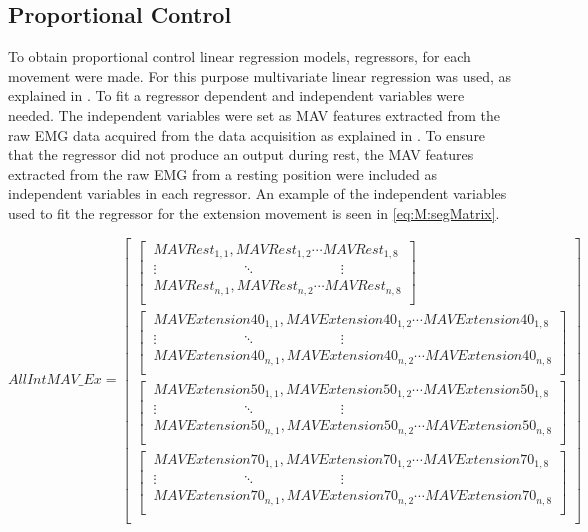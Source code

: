 \subsection{Proportional Control} \label{sub:M:regression}
To obtain proportional control linear regression models, regressors, for each movement were made. For this purpose multivariate linear regression was used, as explained in . To fit a regressor dependent and independent variables were needed. The independent variables were set as MAV features extracted from the raw EMG data acquired from the data acquisition as explained in . To ensure that the regressor did not produce an output during rest, the MAV features extracted from the raw EMG from a resting position were included as independent variables in each regressor. An example of the independent variables used to fit the regressor for the extension movement is seen in \eqref{eq:M:segMatrix}.
\begin{small}

\begin{equation} \label{eq:M:segMatrix}
AllIntMAV\_Ex=\begin{bmatrix}
\begin{bmatrix}
\ MAVRest_{1,1}, MAVRest_{1,2} \cdots MAVRest_{1,8} \\ 
\ \vdots \qquad \qquad \qquad \ddots \qquad \qquad \qquad \vdots \\
\ MAVRest_{n,1}, MAVRest_{n,2}  \cdots MAVRest_{n,8} \\ \end{bmatrix} \\
\begin{bmatrix}
\ MAVExtension40_{1,1}, MAVExtension40_{1,2} \cdots MAVExtension40_{1,8} \\ 
\ \vdots \qquad \qquad \qquad \ddots \qquad \qquad \qquad \vdots \\
\ MAVExtension40_{n,1}, MAVExtension40_{n,2}  \cdots MAVExtension40_{n,8} \\ \end{bmatrix} \\
\begin{bmatrix} 
\ MAVExtension50_{1,1}, MAVExtension50_{1,2} \cdots MAVExtension50_{1,8} \\
\ \vdots \qquad \qquad \qquad \ddots \qquad \qquad \qquad \vdots \\
\ MAVExtension50_{n,1}, MAVExtension50_{n,2} \cdots MAVExtension50_{n,8} \\ \end{bmatrix} \\
\begin{bmatrix} 
\ MAVExtension70_{1,1}, MAVExtension70_{1,2} \cdots MAVExtension70_{1,8} \\
\ \vdots \qquad \qquad \qquad \ddots \qquad \qquad \qquad \vdots \\
\ MAVExtension70_{n,1}, MAVExtension70_{n,2} \cdots MAVExtension70_{n,8} \\ \end{bmatrix} \\
\end{bmatrix}
\end{equation}
\end{small}

